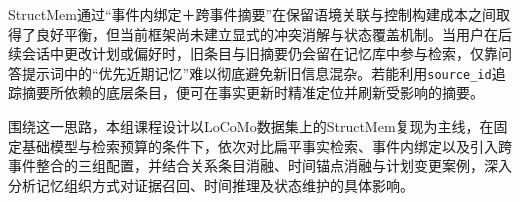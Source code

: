StructMem通过“事件内绑定＋跨事件摘要”在保留语境关联与控制构建成本之间取得了良好平衡，但当前框架尚未建立显式的冲突消解与状态覆盖机制。当用户在后续会话中更改计划或偏好时，旧条目与旧摘要仍会留在记忆库中参与检索，仅靠问答提示词中的“优先近期记忆”难以彻底避免新旧信息混杂。若能利用\texttt{source\_id}追踪摘要所依赖的底层条目，便可在事实更新时精准定位并刷新受影响的摘要。

围绕这一思路，本组课程设计以LoCoMo数据集上的StructMem复现为主线，在固定基础模型与检索预算的条件下，依次对比扁平事实检索、事件内绑定以及引入跨事件整合的三组配置，并结合关系条目消融、时间锚点消融与计划变更案例，深入分析记忆组织方式对证据召回、时间推理及状态维护的具体影响。

